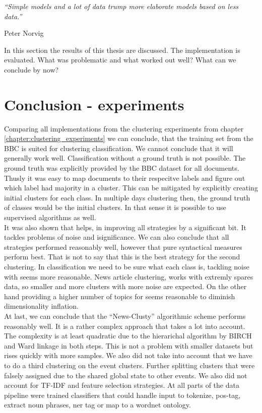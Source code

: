\epigraph{\emph{
  ``Simple models and a lot of data trump more elaborate models based on less data.''
}}{ Peter Norvig }

In this section the results of this thesis are discussed. The implementation is evaluated. What was problematic and what worked out well? What can we conclude by now?

\section{Conclusion - experiments}
Comparing all implementations from the clustering experiments from chapter \ref{chapter:clustering_experiments} we can conclude, that the training set from the BBC is suited for clustering classification. We cannot conclude that it will generally work well. Classification without a ground truth is not possible. The ground truth was explicitly provided by the BBC dataset for all documents. Thusly it was easy to map documents to their respecitve labels and figure out which label had majority in a cluster. This can be mitigated by explicitly creating initial clusters for each class. In multiple days clustering then, the ground truth of classes would be the initial clusters. In that sense it is possible to use supervised algorithms as well.\\

It was also shown that \lsa{} helps, in improving all strategies by a significant bit. It tackles problems of noise and isignificance. We can also conclude that all strategies performed reasonably well, however that pure syntactical measures perform best. That is not to say that this is the best strategy for the second clustering. In classification we need to be sure what each class is, tackling noise with \lsa{} seems more reasonable. News article clustering, works with extremly spares data, so smaller and more clusters with more noise are expected. On the other hand providing a higher number of topics for \lsa{} seems reasonable to diminish dimensionality inflation.\\

At last, we can conclude that the ``News-Clusty'' algorithmic scheme performs reasonably well. It is a rather complex approach that takes a lot into account. The complexity is at least quadratic due to the hierarichal algorithm by BIRCH and Ward linkage in both steps. This is not a problem with smaller datasets but rises quickly with more samples. We also did not take into account that we have to do a third clustering on the event clusters. Further splitting clusters that were falsely assigned due to the shared global state to other events. We also did not account for TF-IDF and feature selection strategies. At all parts of the data pipeline were trained classifiers that could handle input to tokenize, pos-tag, extract noun phrases, ner tag or map to a wordnet ontology.

